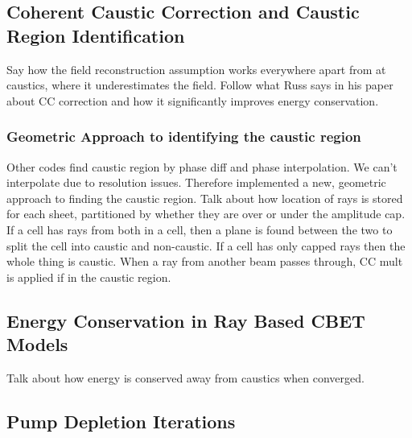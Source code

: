 \subsection{Coherent Caustic Correction and Caustic Region Identification}

Say how the field reconstruction assumption works everywhere apart from at caustics, where it underestimates the field.
Follow what Russ says in his paper about CC correction and how it significantly improves energy conservation.

\subsubsection{Geometric Approach to identifying the caustic region}

Other codes find caustic region by phase diff and phase interpolation.
We can't interpolate due to resolution issues.
Therefore implemented a new, geometric approach to finding the caustic region.
Talk about how location of rays is stored for each sheet, partitioned by whether they are over or under the amplitude cap.
If a cell has rays from both in a cell, then a plane is found between the two to split the cell into caustic and non-caustic.
If a cell has only capped rays then the whole thing is caustic.
When a ray from another beam passes through, CC mult is applied if in the caustic region.


\subsection{Energy Conservation in Ray Based CBET Models}

Talk about how energy is conserved away from caustics when converged.

\subsection{Pump Depletion Iterations}
\label{sec:pump_dep_iters}

